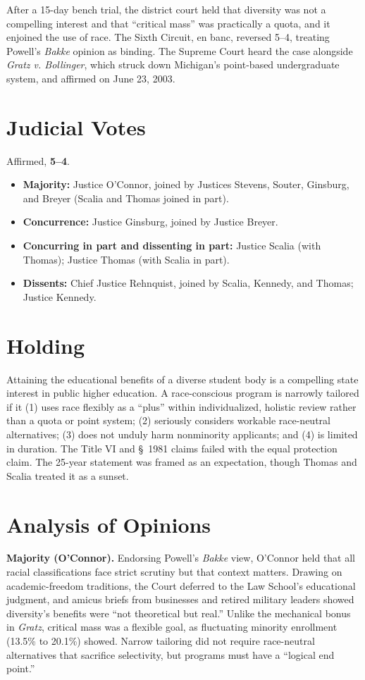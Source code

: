 \documentclass[12pt]{article}
\begin{document}
After a 15-day bench trial, the district court held that diversity was not a compelling interest and that ``critical mass'' was practically a quota, and it enjoined the use of race. The Sixth Circuit, en banc, reversed 5--4, treating Powell's \textit{Bakke} opinion as binding. The Supreme Court heard the case alongside \textit{Gratz v. Bollinger}, which struck down Michigan's point-based undergraduate system, and affirmed on June 23, 2003.

\section{Judicial Votes}

Affirmed, \textbf{5--4}.
\begin{itemize}
\item \textbf{Majority:} Justice O'Connor, joined by Justices Stevens, Souter, Ginsburg, and Breyer (Scalia and Thomas joined in part).
\item \textbf{Concurrence:} Justice Ginsburg, joined by Justice Breyer.
\item \textbf{Concurring in part and dissenting in part:} Justice Scalia (with Thomas); Justice Thomas (with Scalia in part).
\item \textbf{Dissents:} Chief Justice Rehnquist, joined by Scalia, Kennedy, and Thomas; Justice Kennedy.
\end{itemize}

\section{Holding}

Attaining the educational benefits of a diverse student body is a compelling state interest in public higher education. A race-conscious program is narrowly tailored if it (1) uses race flexibly as a ``plus'' within individualized, holistic review rather than a quota or point system; (2) seriously considers workable race-neutral alternatives; (3) does not unduly harm nonminority applicants; and (4) is limited in duration. The Title VI and \S~1981 claims failed with the equal protection claim. The 25-year statement was framed as an expectation, though Thomas and Scalia treated it as a sunset.

\section{Analysis of Opinions}

\textbf{Majority (O'Connor).} Endorsing Powell's \textit{Bakke} view, O'Connor held that all racial classifications face strict scrutiny but that context matters. Drawing on academic-freedom traditions, the Court deferred to the Law School's educational judgment, and amicus briefs from businesses and retired military leaders showed diversity's benefits were ``not theoretical but real.'' Unlike the mechanical bonus in \textit{Gratz}, critical mass was a flexible goal, as fluctuating minority enrollment (13.5\% to 20.1\%) showed. Narrow tailoring did not require race-neutral alternatives that sacrifice selectivity, but programs must have a ``logical end point.''
\end{document}
